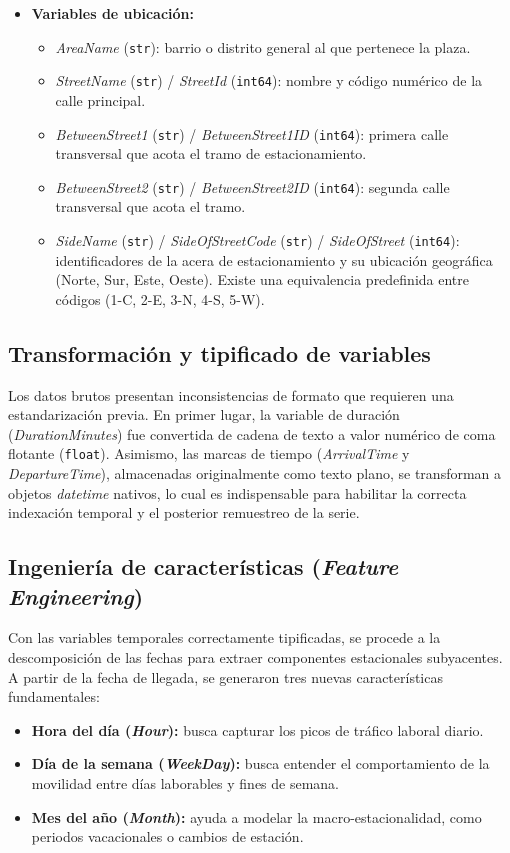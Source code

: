 \begin{itemize}
	\item \textbf{Variables de ubicación:}
	\begin{itemize}
		\item \textit{AreaName} (\texttt{str}): barrio o distrito general al que pertenece la plaza.
		\item \textit{StreetName} (\texttt{str}) / \textit{StreetId} (\texttt{int64}): nombre y código numérico de la calle principal.
		\item \textit{BetweenStreet1} (\texttt{str}) / \textit{BetweenStreet1ID} (\texttt{int64}): primera calle transversal que acota el tramo de estacionamiento.
		\item \textit{BetweenStreet2} (\texttt{str}) / \textit{BetweenStreet2ID} (\texttt{int64}): segunda calle transversal que acota el tramo.
		\item \textit{SideName} (\texttt{str}) / \textit{SideOfStreetCode} (\texttt{str}) / \textit{SideOfStreet} (\texttt{int64}): identificadores de la acera de estacionamiento y su ubicación geográfica (Norte, Sur, Este, Oeste). Existe una equivalencia predefinida entre códigos (1-C, 2-E, 3-N, 4-S, 5-W).
	\end{itemize}
\end{itemize}

\subsection{Transformación y tipificado de variables}
\label{subsec:transformacion}
Los datos brutos presentan inconsistencias de formato que requieren una estandarización previa. En primer lugar, la variable de duración (\textit{DurationMinutes}) fue convertida de cadena de texto a valor numérico de coma flotante (\texttt{float}). Asimismo, las marcas de tiempo (\textit{ArrivalTime} y \textit{DepartureTime}), almacenadas originalmente como texto plano, se transforman a objetos \textit{datetime} nativos, lo cual es indispensable para habilitar la correcta indexación temporal y el posterior remuestreo de la serie.


\subsection{Ingeniería de características (\textit{Feature Engineering})}
\label{subsec:feature_engineering}
Con las variables temporales correctamente tipificadas, se procede a la descomposición de las fechas para extraer componentes estacionales subyacentes. A partir de la fecha de llegada, se generaron tres nuevas características fundamentales:
\begin{itemize}
	\item \textbf{Hora del día (\textit{Hour}):} busca capturar los picos de tráfico laboral diario.
	\item \textbf{Día de la semana (\textit{WeekDay}):} busca entender el comportamiento de la movilidad entre días laborables y fines de semana.
	\item \textbf{Mes del año (\textit{Month}):} ayuda a modelar la macro-estacionalidad, como periodos vacacionales o cambios de estación.
\end{itemize}

